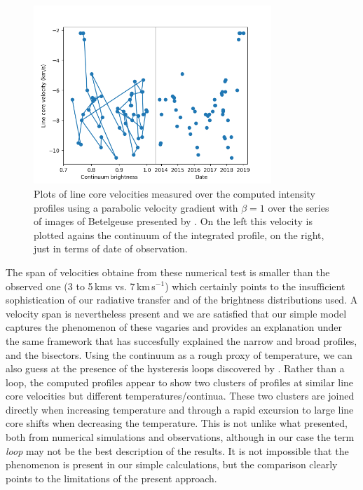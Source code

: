 \documentclass{/Users/art2/TeX/aanda/aa}
\def\kms {km\,s$^{-1}$}
\begin{document}
\begin{figure}
   \includegraphics[width=0.8\textwidth]{Fig11_art74.png}
   \caption{Plots of line core velocities measured over the computed intensity profiles using a parabolic velocity gradient with $\beta=1$ over the 
   series of images of Betelgeuse presented by \cite{auriere_discovery_2016} \cite{lopez_ariste_height_2023}. On the left this velocity is plotted 
   agains the continuum of the integrated profile, on the right, just in terms of date of observation. }
   \label{hysteresis}
   \end{figure}

The span of velocities obtaine from these numerical test is smaller than the observed one (3 to 5\,kms vs. 7\,\kms) which certainly points to the insufficient 
sophistication of our radiative transfer and of the brightness distributions used. A velocity span is nevertheless present and we are satisfied that 
our simple model captures the phenomenon of these vagaries and provides an explanation under the same framework that has succesfully explained the narrow 
and broad profiles, and the bisectors. Using the continuum as a rough proxy of temperature, we can also guess at the presence of the hysteresis loops 
discovered by \cite{kravchenko_tomography_2018}. Rather than a loop, the computed profiles appear to show two clusters of profiles at similar line core 
velocities but different temperatures/continua. These two clusters are joined directly when increasing temperature and through a rapid excursion to 
large line core shifts when decreasing the temperature. This is not unlike what \cite{kravchenko_tomography_2019} presented, both from numerical simulations
and observations, although in our case the term \textit{loop} may not be the best description of the results. It is not impossible that the phenomenon 
is present in our simple calculations, but the comparison clearly points to the limitations of the present approach.
\end{document}
